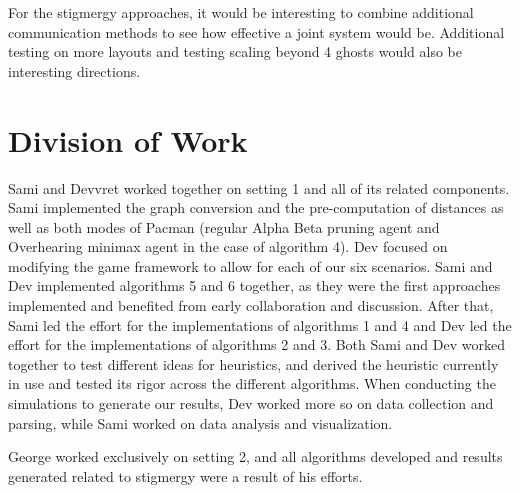\documentclass[11pt]{article}
\begin{document}
For the stigmergy approaches, it would be interesting to combine additional communication methods to see how effective a joint system would be.  Additional testing on more layouts and testing scaling beyond 4 ghosts would also be interesting directions.

\section{Division of Work}
Sami and Devvret worked together on setting 1 and all of its related components. Sami implemented the graph conversion and the pre-computation of distances as well as both modes of Pacman (regular Alpha Beta pruning agent and Overhearing minimax agent in the case of algorithm 4). Dev focused on modifying the game framework to allow for each of our six scenarios. Sami and Dev implemented algorithms 5 and 6 together, as they were the first approaches implemented and benefited from early collaboration and discussion. After that, Sami led the effort for the implementations of algorithms 1 and 4 and Dev led the effort for the implementations of algorithms 2 and 3. Both Sami and Dev worked together to test different ideas for heuristics, and derived the heuristic currently in use and tested its rigor across the different algorithms. When conducting the simulations to generate our results, Dev worked more so on data collection and parsing, while Sami worked on data analysis and visualization.  

George worked exclusively on setting 2, and all algorithms developed and results generated related to stigmergy were a result of his efforts.




\vspace*{9 in}
\vspace*{1 in}
\end{document}
